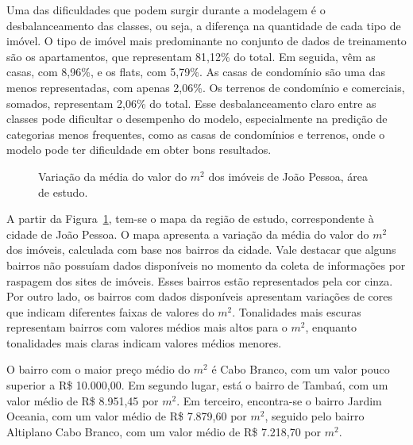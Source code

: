 \documentclass[
  12pt,
  a4paper,
]{scrreprt}
\begin{document}
\vspace{12pt}

Uma das dificuldades que podem surgir durante a modelagem é o
desbalanceamento das classes, ou seja, a diferença na quantidade de cada
tipo de imóvel. O tipo de imóvel mais predominante no conjunto de dados
de treinamento são os apartamentos, que representam 81,12\% do total. Em
seguida, vêm as casas, com 8,96\%, e os flats, com 5,79\%. As casas de
condomínio são uma das menos representadas, com apenas 2,06\%. Os
terrenos de condomínio e comerciais, somados, representam 2,06\% do
total. Esse desbalanceamento claro entre as classes pode dificultar o
desempenho do modelo, especialmente na predição de categorias menos
frequentes, como as casas de condomínios e terrenos, onde o modelo pode
ter dificuldade em obter bons resultados.

\begin{figure}


\caption{\label{fig-mapa_valor}Variação da média do valor do \(m^2\) dos
imóveis de João Pessoa, área de estudo.}

\end{figure}%

A partir da Figura~\ref{fig-mapa_valor}, tem-se o mapa da região de
estudo, correspondente à cidade de João Pessoa. O mapa apresenta a
variação da média do valor do \(m^2\) dos imóveis, calculada com base
nos bairros da cidade. Vale destacar que alguns bairros não possuíam
dados disponíveis no momento da coleta de informações por raspagem dos
sites de imóveis. Esses bairros estão representados pela cor cinza. Por
outro lado, os bairros com dados disponíveis apresentam variações de
cores que indicam diferentes faixas de valores do \(m^2\). Tonalidades
mais escuras representam bairros com valores médios mais altos para o
\(m^2\), enquanto tonalidades mais claras indicam valores médios
menores.

\vspace{12pt}

O bairro com o maior preço médio do \(m^2\) é Cabo Branco, com um valor
pouco superior a R\$ 10.000,00. Em segundo lugar, está o bairro de
Tambaú, com um valor médio de R\$ 8.951,45 por \(m^2\). Em terceiro,
encontra-se o bairro Jardim Oceania, com um valor médio de R\$ 7.879,60
por \(m^2\), seguido pelo bairro Altiplano Cabo Branco, com um valor
médio de R\$ 7.218,70 por \(m^2\).
\end{document}

